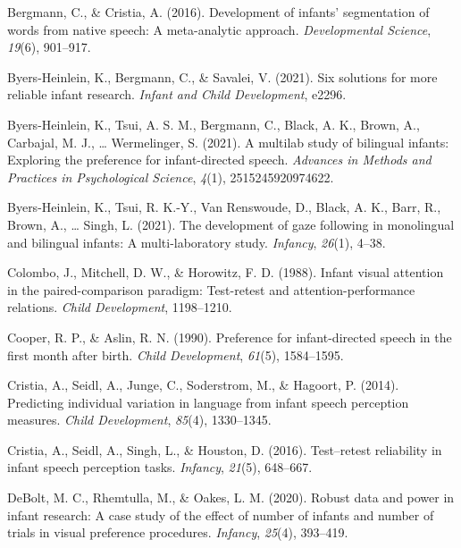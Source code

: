 \documentclass[
  man,floatsintext]{apa6}
\newlength{\cslhangindent}
\newlength{\cslentryspacingunit} %
\newenvironment{CSLReferences}[2] %
 {%
  \setlength{\parindent}{0pt}
  \ifodd #1
  \let\oldpar\par
  \def\par{\hangindent=\cslhangindent\oldpar}
  \fi
  \setlength{\parskip}{#2\cslentryspacingunit}
 }%
 {}
\begin{document}
\hypertarget{refs}{}
\begin{CSLReferences}{1}{0}
\leavevmode{}%
Bergmann, C., \& Cristia, A. (2016). Development of infants' segmentation of words from native speech: A meta-analytic approach. \emph{Developmental Science}, \emph{19}(6), 901--917.

\leavevmode{}%
Byers-Heinlein, K., Bergmann, C., \& Savalei, V. (2021). Six solutions for more reliable infant research. \emph{Infant and Child Development}, e2296.

\leavevmode{}%
Byers-Heinlein, K., Tsui, A. S. M., Bergmann, C., Black, A. K., Brown, A., Carbajal, M. J., \ldots{} Wermelinger, S. (2021). A multilab study of bilingual infants: Exploring the preference for infant-directed speech. \emph{Advances in Methods and Practices in Psychological Science}, \emph{4}(1), 2515245920974622.

\leavevmode{}%
Byers-Heinlein, K., Tsui, R. K.-Y., Van Renswoude, D., Black, A. K., Barr, R., Brown, A., \ldots{} Singh, L. (2021). The development of gaze following in monolingual and bilingual infants: A multi-laboratory study. \emph{Infancy}, \emph{26}(1), 4--38.

\leavevmode{}%
Colombo, J., Mitchell, D. W., \& Horowitz, F. D. (1988). Infant visual attention in the paired-comparison paradigm: Test-retest and attention-performance relations. \emph{Child Development}, 1198--1210.

\leavevmode{}%
Cooper, R. P., \& Aslin, R. N. (1990). Preference for infant-directed speech in the first month after birth. \emph{Child Development}, \emph{61}(5), 1584--1595.

\leavevmode{}%
Cristia, A., Seidl, A., Junge, C., Soderstrom, M., \& Hagoort, P. (2014). Predicting individual variation in language from infant speech perception measures. \emph{Child Development}, \emph{85}(4), 1330--1345.

\leavevmode{}%
Cristia, A., Seidl, A., Singh, L., \& Houston, D. (2016). Test--retest reliability in infant speech perception tasks. \emph{Infancy}, \emph{21}(5), 648--667.

\leavevmode{}%
DeBolt, M. C., Rhemtulla, M., \& Oakes, L. M. (2020). Robust data and power in infant research: A case study of the effect of number of infants and number of trials in visual preference procedures. \emph{Infancy}, \emph{25}(4), 393--419.


\end{CSLReferences}
\end{document}
